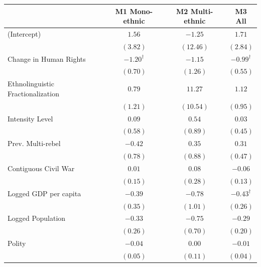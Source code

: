 \documentclass[12pt,]{book}
\let\origtable\table
\let\endorigtable\endtable
\renewenvironment{table}[1][2] {
    \singlespacing
    \expandafter\origtable\expandafter[H]
} {
    \endorigtable
}
\theoremstyle{definition}
\theoremstyle{definition}
\theoremstyle{remark}
\begin{document}
\begin{table}
\begin{center}
\begin{tabular}{l c c c }
\hline
 & M1 Mono-ethnic & M2 Multi-ethnic & M3 All \\
\hline
(Intercept)                       & $1.56$            & $-1.25$   & $1.71$            \\
                                  & $(3.82)$          & $(12.46)$ & $(2.84)$          \\
Change in Human Rights            & $-1.20^{\dagger}$ & $-1.15$   & $-0.99^{\dagger}$ \\
                                  & $(0.70)$          & $(1.26)$  & $(0.55)$          \\
Ethnolinguistic Fractionalization & $0.79$            & $11.27$   & $1.12$            \\
                                  & $(1.21)$          & $(10.54)$ & $(0.95)$          \\
Intensity Level                   & $0.09$            & $0.54$    & $0.03$            \\
                                  & $(0.58)$          & $(0.89)$  & $(0.45)$          \\
Prev. Multi-rebel                 & $-0.42$           & $0.35$    & $0.31$            \\
                                  & $(0.78)$          & $(0.88)$  & $(0.47)$          \\
Contiguous Civil War              & $0.01$            & $0.08$    & $-0.06$           \\
                                  & $(0.15)$          & $(0.28)$  & $(0.13)$          \\
Logged GDP per capita             & $-0.39$           & $-0.78$   & $-0.43^{\dagger}$ \\
                                  & $(0.35)$          & $(1.01)$  & $(0.26)$          \\
Logged Population                 & $-0.33$           & $-0.75$   & $-0.29$           \\
                                  & $(0.26)$          & $(0.70)$  & $(0.20)$          \\
Polity                            & $-0.04$           & $0.00$    & $-0.01$           \\
                                  & $(0.05)$          & $(0.11)$  & $(0.04)$          \\
\hline

\end{tabular}
\end{center}
\end{table}
\end{document}
